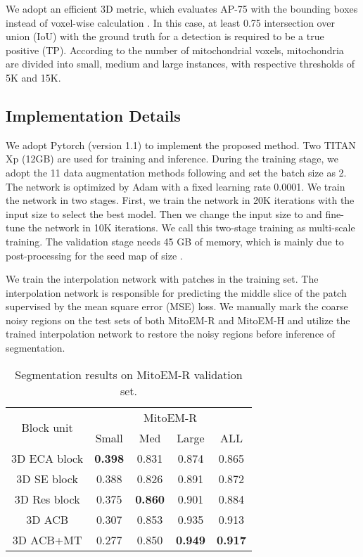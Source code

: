 \documentclass{article}
\begin{document}
We adopt an efficient 3D metric, which evaluates AP-75 with the bounding boxes instead of voxel-wise calculation \cite{wei2020mitoem}. In this case, at least 0.75 intersection over union (IoU) with the ground truth for a detection is required to be a true positive (TP). According to the number of mitochondrial voxels, mitochondria are divided into small, medium and large instances, with respective thresholds of 5K and 15K.




\subsection{Implementation Details}
We adopt Pytorch (version 1.1) to implement the proposed method. Two TITAN Xp (12GB) are used for training and inference. During the training stage, we adopt the 11 data augmentation methods following \cite{wei2020mitoem}  and set the batch size as 2. The network is optimized by Adam with a fixed learning rate 0.0001. We train the network in two stages. First, we train the network in 20K iterations with the input size   to select the best model. Then we change the input size to  and fine-tune the network in 10K iterations. We call this two-stage training as multi-scale training. The validation stage needs 45 GB of memory, which is mainly due to post-processing for the seed map of size .

We train the interpolation network with  patches in the training set. The interpolation network is responsible for predicting the middle slice of the patch supervised by the mean square error (MSE) loss. We manually mark the coarse noisy regions on the test sets of both MitoEM-R and MitoEM-H  and utilize the trained interpolation network to restore the noisy regions before inference of segmentation.





\begin{table}[t]
\centering
\begin{tabular}{ccccc}
\hline
\multirow{2}{*}{Block unit} & \multicolumn{4}{c}{MitoEM-R} \\ \cline{2-5} 
                 & Small  & Med  & Large  & ALL \\ \hline
3D ECA block        & \textbf{0.398}  & 0.831 & 0.874 & 0.865 \\ 
3D SE block                & 0.388  & 0.826 & 0.891 & 0.872 \\ 
3D Res block        & 0.375  & \textbf{0.860} & 0.901 & 0.884 \\ 
3D ACB         & 0.307  & 0.853 & 0.935 & 0.913 \\
\hline
3D ACB+MT   & 0.277  & 0.850 & \textbf{0.949} & \textbf{0.917} \\
\hline
\end{tabular}
\caption{Segmentation results on MitoEM-R validation set.}
\label{tab:rat_result}
\end{table}
\end{document}
